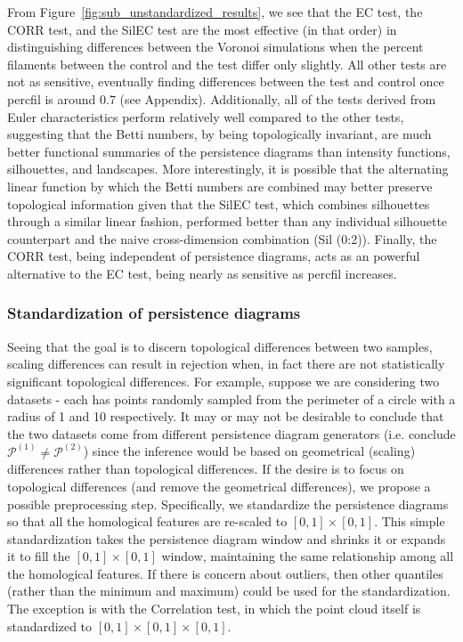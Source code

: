\documentclass[12pt]{article}
\newcommand{\figref}[1]{Figure~\ref{#1}}
\begin{document}
From \figref{fig:sub_unstandardized_results}, we see  that the EC test, the CORR test, and the SilEC test are the most effective (in that order) in distinguishing differences between the Voronoi simulations when the percent filaments between the control and the test differ only slightly. All other tests are not as sensitive, eventually finding differences between the test and control once percfil is around 0.7 (see Appendix). Additionally, all of the tests derived from Euler characteristics perform relatively well compared to the other tests, suggesting that the Betti numbers, by being topologically invariant, are much better functional summaries of the persistence diagrams than intensity functions, silhouettes, and landscapes. More interestingly, it is possible that the alternating linear function by which the Betti numbers are combined may better preserve topological information given that the SilEC test, which combines silhouettes through a similar linear fashion, performed better than any individual silhouette counterpart and the naive cross-dimension combination (Sil (0:2)). Finally, the CORR test, being independent of persistence diagrams, acts as an powerful alternative to the EC test, being nearly as sensitive as percfil increases.

\subsubsection{Standardization of persistence diagrams} \label{sec:standardize}
Seeing that the goal is to discern topological differences between two samples, scaling differences can result in rejection when, in fact there are not statistically significant topological differences. For example, suppose we are considering two datasets - each has points randomly sampled from the perimeter of a circle with a radius of 1 and 10 respectively.  It may or may not be desirable to conclude that the two datasets come from different persistence diagram generators (i.e. conclude $\mathcal P^{(1)} \neq \mathcal P^{(2)}$) since the inference would be based on geometrical (scaling) differences rather than topological differences.  If the desire is to focus on topological differences (and remove the geometrical differences), we propose a possible preprocessing step. Specifically, we standardize the persistence diagrams so that all the homological features are re-scaled to $[0, 1]\times[0,1]$. This simple standardization takes the persistence diagram window and shrinks it or expands it to fill the $[0, 1]\times[0,1]$ window, maintaining the same relationship among all the homological features.  If there is concern about outliers, then other quantiles (rather than the minimum and maximum) could be used for the standardization. The exception is with the Correlation test, in which the point cloud itself is standardized to $[0, 1]\times[0, 1]\times[0, 1]$.
\end{document}
